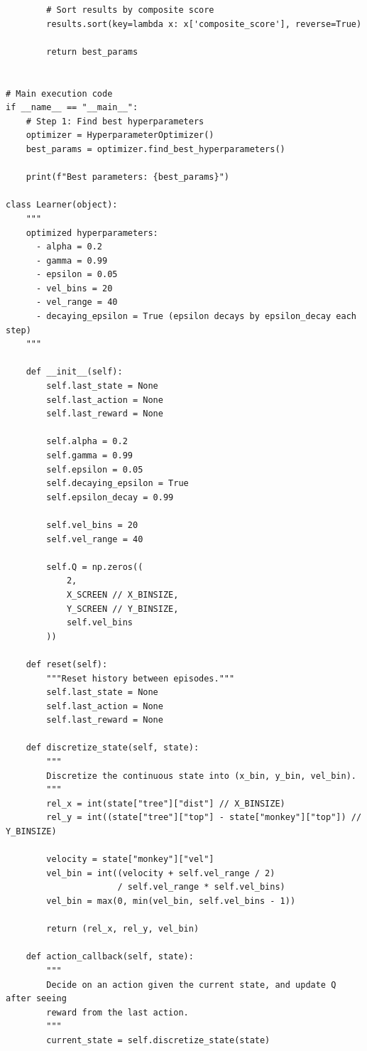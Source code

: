 \documentclass[submit]{../harvardml}
\begin{document}
\begin{lstlisting}
        # Sort results by composite score
        results.sort(key=lambda x: x['composite_score'], reverse=True)
        
        return best_params


# Main execution code
if __name__ == "__main__":
    # Step 1: Find best hyperparameters
    optimizer = HyperparameterOptimizer()
    best_params = optimizer.find_best_hyperparameters()
    
    print(f"Best parameters: {best_params}")

class Learner(object):
    """
    optimized hyperparameters:
      - alpha = 0.2
      - gamma = 0.99
      - epsilon = 0.05 
      - vel_bins = 20
      - vel_range = 40
      - decaying_epsilon = True (epsilon decays by epsilon_decay each step)
    """

    def __init__(self):
        self.last_state = None
        self.last_action = None
        self.last_reward = None

        self.alpha = 0.2          
        self.gamma = 0.99         
        self.epsilon = 0.05       
        self.decaying_epsilon = True
        self.epsilon_decay = 0.99

        self.vel_bins = 20
        self.vel_range = 40

        self.Q = np.zeros((
            2,
            X_SCREEN // X_BINSIZE,
            Y_SCREEN // Y_BINSIZE,
            self.vel_bins
        ))

    def reset(self):
        """Reset history between episodes."""
        self.last_state = None
        self.last_action = None
        self.last_reward = None

    def discretize_state(self, state):
        """
        Discretize the continuous state into (x_bin, y_bin, vel_bin).
        """
        rel_x = int(state["tree"]["dist"] // X_BINSIZE)
        rel_y = int((state["tree"]["top"] - state["monkey"]["top"]) // Y_BINSIZE)

        velocity = state["monkey"]["vel"]
        vel_bin = int((velocity + self.vel_range / 2)
                      / self.vel_range * self.vel_bins)
        vel_bin = max(0, min(vel_bin, self.vel_bins - 1))

        return (rel_x, rel_y, vel_bin)

    def action_callback(self, state):
        """
        Decide on an action given the current state, and update Q after seeing
        reward from the last action.
        """
        current_state = self.discretize_state(state)


\end{lstlisting}
\end{document}
